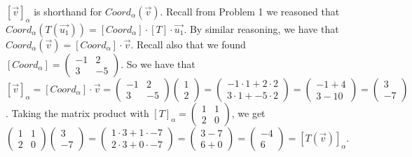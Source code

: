 \documentclass[12pt]{article}
\newenvironment{problem}[2][Problem]
{
	\begin{trivlist} 
		\item[\hskip \labelsep {\bfseries #1 #2:}]
	}
{
	\end{trivlist}
	}
\newenvironment{solution}[1][Solution]
{
	\begin{trivlist} 
		\item[\hskip \labelsep {\itshape #1:}]
	}
	{
	\end{trivlist}
}
\begin{document}
\begin{problem}{3}
\begin{solution}
$[\vec{v}]_{\alpha}$ is shorthand for $Coord_{\alpha} (\vec{v})$. Recall from Problem 1 we reasoned that $Coord_{\alpha} (T(\vec{u_{1}})) = [Coord_{\alpha}] \cdot [T] \cdot \vec{u_{1}}$. By similar reasoning, we have that $Coord_{\alpha} (\vec{v}) = [Coord_{\alpha}] \cdot \vec{v}$. Recall also that we found $[Coord_{\alpha}] = \begin{pmatrix} -1 & 2\\3 & -5 \end{pmatrix}$. So we have that $[\vec{v}]_{\alpha} = [Coord_{\alpha}] \cdot \vec{v} = \begin{pmatrix} -1 & 2\\3 & -5 \end{pmatrix} \begin{pmatrix}1\\2\end{pmatrix} = \begin{pmatrix} -1\cdot 1 + 2\cdot 2\\3\cdot 1 + -5\cdot 2 \end{pmatrix} = \begin{pmatrix} -1+4\\3 -10 \end{pmatrix}=\begin{pmatrix} 3\\-7 \end{pmatrix}$. Taking the matrix product with $[T]_{\alpha} =\begin{pmatrix} 1&1\\ 2&0\end{pmatrix}$, we get $\begin{pmatrix} 1&1\\ 2&0\end{pmatrix} \begin{pmatrix} 3\\-7 \end{pmatrix} =\begin{pmatrix} 1\cdot 3 +1\cdot -7\\ 2\cdot 3 + 0 \cdot -7\end{pmatrix} = \begin{pmatrix} 3-7\\ 6+ 0  \end{pmatrix} = \begin{pmatrix} -4\\ 6 \end{pmatrix} = [T(\vec{v})]_{\alpha}$.
\end{solution}
\end{problem}
\end{document}
